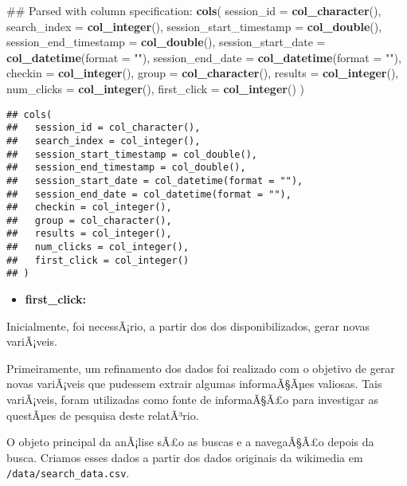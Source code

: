 \documentclass[]{article}
\newenvironment{Shaded}{\begin{snugshade}}{\end{snugshade}}
\newcommand{\KeywordTok}[1]{\textcolor[rgb]{0.13,0.29,0.53}{\textbf{#1}}}
\newcommand{\DataTypeTok}[1]{\textcolor[rgb]{0.13,0.29,0.53}{#1}}
\newcommand{\StringTok}[1]{\textcolor[rgb]{0.31,0.60,0.02}{#1}}
\newcommand{\NormalTok}[1]{#1}
\providecommand{\tightlist}{%
  \setlength{\itemsep}{0pt}\setlength{\parskip}{0pt}}
\begin{document}
\begin{Shaded}
\begin{Highlighting}[]
\NormalTok{## Parsed with column specification:}
 \KeywordTok{cols}\NormalTok{(}
   \DataTypeTok{session_id =} \KeywordTok{col_character}\NormalTok{(),}
   \DataTypeTok{search_index =} \KeywordTok{col_integer}\NormalTok{(),}
   \DataTypeTok{session_start_timestamp =} \KeywordTok{col_double}\NormalTok{(),}
   \DataTypeTok{session_end_timestamp =} \KeywordTok{col_double}\NormalTok{(),}
   \DataTypeTok{session_start_date =} \KeywordTok{col_datetime}\NormalTok{(}\DataTypeTok{format =} \StringTok{""}\NormalTok{),}
   \DataTypeTok{session_end_date =} \KeywordTok{col_datetime}\NormalTok{(}\DataTypeTok{format =} \StringTok{""}\NormalTok{),}
   \DataTypeTok{checkin =} \KeywordTok{col_integer}\NormalTok{(),}
   \DataTypeTok{group =} \KeywordTok{col_character}\NormalTok{(),}
   \DataTypeTok{results =} \KeywordTok{col_integer}\NormalTok{(),}
   \DataTypeTok{num_clicks =} \KeywordTok{col_integer}\NormalTok{(),}
   \DataTypeTok{first_click =} \KeywordTok{col_integer}\NormalTok{()}
\NormalTok{ )}
\end{Highlighting}
\end{Shaded}

\begin{verbatim}
## cols(
##   session_id = col_character(),
##   search_index = col_integer(),
##   session_start_timestamp = col_double(),
##   session_end_timestamp = col_double(),
##   session_start_date = col_datetime(format = ""),
##   session_end_date = col_datetime(format = ""),
##   checkin = col_integer(),
##   group = col_character(),
##   results = col_integer(),
##   num_clicks = col_integer(),
##   first_click = col_integer()
## )
\end{verbatim}

\begin{itemize}
\tightlist
\item
  \textbf{first\_click:}
\end{itemize}

Inicialmente, foi necessÃ¡rio, a partir dos dos disponibilizados, gerar
novas variÃ¡veis.

Primeiramente, um refinamento dos dados foi realizado com o objetivo de
gerar novas variÃ¡veis que pudessem extrair algumas informaÃ§Ãµes
valiosas. Tais variÃ¡veis, foram utilizadas como fonte de informaÃ§Ã£o
para investigar as questÃµes de pesquisa deste relatÃ³rio.

O objeto principal da anÃ¡lise sÃ£o as buscas e a navegaÃ§Ã£o depois da
busca. Criamos esses dados a partir dos dados originais da wikimedia em
\texttt{/data/search\_data.csv}.
\end{document}
